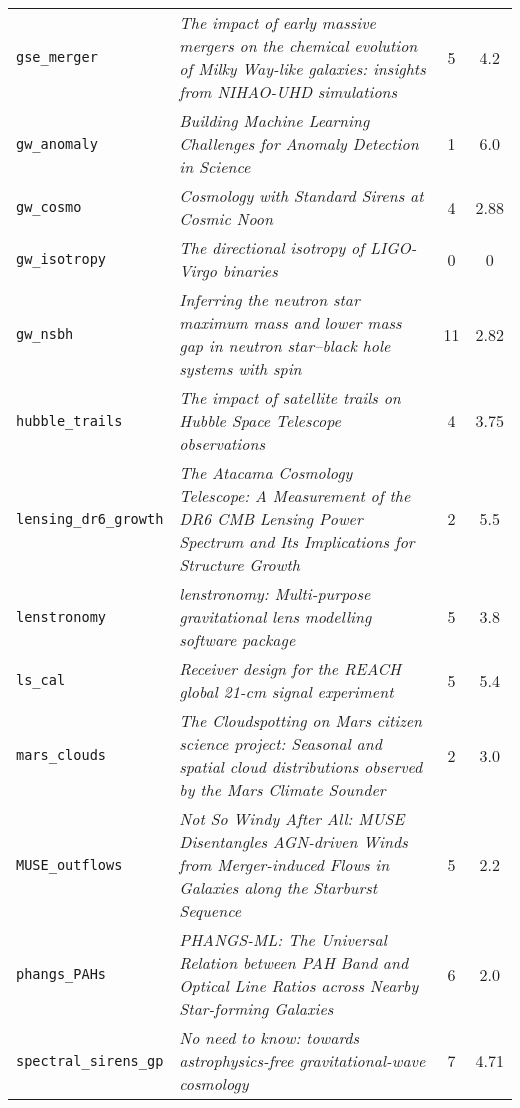 \begin{table}[htbp]
\begin{tabular}{lp{7.5cm}cc}
\small\texttt{gse\_merger} & \small\textit{The impact of early massive mergers on the chemical evolution of Milky Way-like galaxies: insights from NIHAO-UHD simulations} \citep{gse_merger} & 5 & 4.2 \\
\small\texttt{gw\_anomaly} & \small\textit{Building Machine Learning Challenges for Anomaly Detection in Science} \citep{gw_anomaly} & 1 & 6.0 \\
\small\texttt{gw\_cosmo} & \small\textit{Cosmology with Standard Sirens at Cosmic Noon} \citep{gw_cosmo} & 4 & 2.88 \\
\small\texttt{gw\_isotropy} & \small\textit{The directional isotropy of LIGO-Virgo binaries} \citep{gw_isotropy} & 0 & 0 \\
\small\texttt{gw\_nsbh} & \small\textit{Inferring the neutron star maximum mass and lower mass gap in neutron star--black hole systems with spin} \citep{gw_nsbh} & 11 & 2.82 \\
\small\texttt{hubble\_trails} & \small\textit{The impact of satellite trails on Hubble Space Telescope observations} \citep{hubble_trails} & 4 & 3.75 \\
\small\texttt{lensing\_dr6\_growth} & \small\textit{The Atacama Cosmology Telescope: A Measurement of the DR6 CMB Lensing Power Spectrum and Its Implications for Structure Growth} \citep{lensing_dr6_growth} & 2 & 5.5 \\
\small\texttt{lenstronomy} & \small\textit{lenstronomy: Multi-purpose gravitational lens modelling software package} \citep{lenstronomy} & 5 & 3.8 \\
\small\texttt{ls\_cal} & \small\textit{Receiver design for the REACH global 21-cm signal experiment} \citep{ls_cal} & 5 & 5.4 \\
\small\texttt{mars\_clouds} & \small\textit{The Cloudspotting on Mars citizen science project: Seasonal and spatial cloud distributions observed by the Mars Climate Sounder} \citep{mars_clouds} & 2 & 3.0 \\
\small\texttt{MUSE\_outflows} & \small\textit{Not So Windy After All: MUSE Disentangles AGN-driven Winds from Merger-induced Flows in Galaxies along the Starburst Sequence} \citep{MUSE_outflows} & 5 & 2.2 \\
\small\texttt{phangs\_PAHs} & \small\textit{PHANGS-ML: The Universal Relation between PAH Band and Optical Line Ratios across Nearby Star-forming Galaxies} \citep{phangs_PAHs} & 6 & 2.0 \\
\small\texttt{spectral\_sirens\_gp} & \small\textit{No need to know: towards astrophysics-free gravitational-wave cosmology} \citep{spectral_sirens_gp} & 7 & 4.71 \\

\end{tabular}
\end{table}
